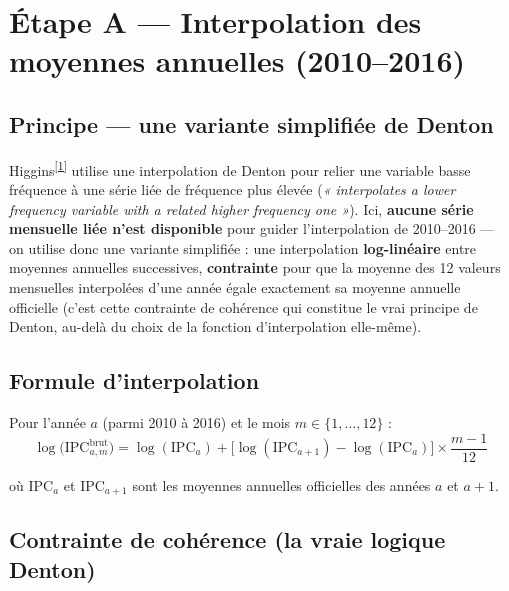\documentclass[11pt,a4paper]{article}
\newcommand{\cit}[1]{\textsuperscript{\hyperlink{ref#1}{[#1]}}}
\begin{document}
\section{Étape A --- Interpolation des moyennes annuelles (2010--2016)}

\subsection{Principe --- une variante simplifiée de Denton}

\begin{noteboxbleu}
Higgins\cit{1} utilise une interpolation de Denton pour relier une variable basse fréquence à une série liée de fréquence plus élevée (\textit{« interpolates a lower frequency variable with a related higher frequency one »}). Ici, \textbf{aucune série mensuelle liée n'est disponible} pour guider l'interpolation de 2010--2016 --- on utilise donc une variante simplifiée : une interpolation \textbf{log-linéaire} entre moyennes annuelles successives, \textbf{contrainte} pour que la moyenne des 12 valeurs mensuelles interpolées d'une année égale exactement sa moyenne annuelle officielle (c'est cette contrainte de cohérence qui constitue le vrai principe de Denton, au-delà du choix de la fonction d'interpolation elle-même).
\end{noteboxbleu}

\subsection{Formule d'interpolation}

Pour l'année $a$ (parmi 2010 à 2016) et le mois $m\in\{1,\dots,12\}$ :
\begin{equation}
\log\big(\text{IPC}_{a,m}^{\text{brut}}\big) = \log(\text{IPC}_a) + \big[\log(\text{IPC}_{a+1}) - \log(\text{IPC}_a)\big] \times \frac{m-1}{12}
\label{eq:interp_lineaire}
\end{equation}

où $\text{IPC}_a$ et $\text{IPC}_{a+1}$ sont les moyennes annuelles officielles des années $a$ et $a+1$.

\subsection{Contrainte de cohérence (la vraie logique Denton)}
\end{document}
